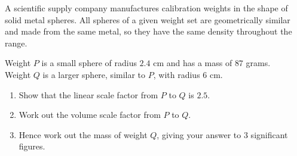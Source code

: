 \begin{question}
\noindent A scientific supply company manufactures calibration weights in the shape of solid metal spheres. All spheres of a given weight set are geometrically similar and made from the same metal, so they have the same density throughout the range.

\noindent Weight $P$ is a small sphere of radius $2.4$ cm and has a mass of $87$ grams.\\
Weight $Q$ is a larger sphere, similar to $P$, with radius $6$ cm.

\begin{enumerate}
    \item[(a)] Show that the linear scale factor from $P$ to $Q$ is $2.5$.
    \vspace{2.5cm}

    \item[(b)] Work out the volume scale factor from $P$ to $Q$.
    \vspace{2.5cm}

    \item[(c)] Hence work out the mass of weight $Q$, giving your answer to 3 significant figures.
    \vspace{4cm}
\end{enumerate}
\end{question}
